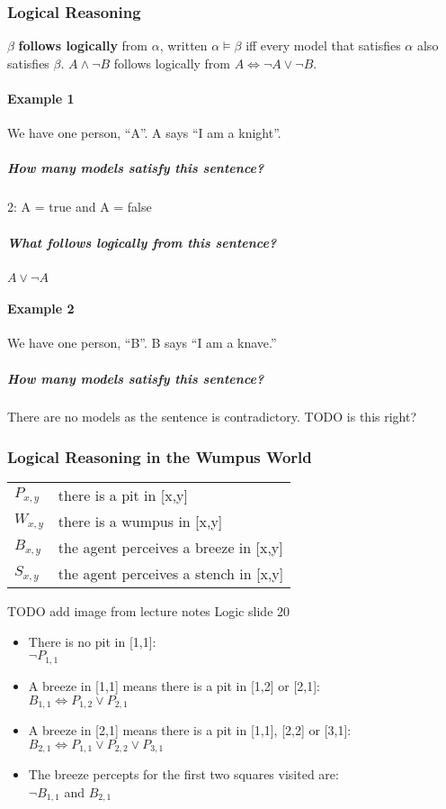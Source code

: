 \subsubsection{Logical Reasoning}
$\beta$ \textbf{follows logically} from $\alpha$, written $\alpha \models
\beta$ iff every model that satisfies $\alpha$ also satisfies $\beta$. $A \land
\neg B$ follows logically from $A \Leftrightarrow \neg A \lor \neg B$.

\paragraph{Example 1} We have one person, ``A''. A says ``I am a knight''.
\subparagraph{How many models satisfy this sentence?} 2: {A = true} and {A =
false}
\subparagraph{What follows logically from this sentence?} $A \lor \neg A$

\paragraph{Example 2} We have one person, ``B''. B says ``I am a knave.''
\subparagraph{How many models satisfy this sentence?} There are no models as
the sentence is contradictory. TODO is this right?

\subsubsection{Logical Reasoning in the Wumpus World}
\begin{tabular}{l l}
$P_{x,y}$ & there is a pit in [x,y]\\
$W_{x,y}$ & there is a wumpus in [x,y]\\
$B_{x,y}$ & the agent perceives a breeze in [x,y]\\
$S_{x,y}$ & the agent perceives a stench in [x,y]
\end{tabular}

TODO add image from lecture notes Logic slide 20

\begin{itemize}
    \item There is no pit in [1,1]:\\
          $\neg P_{1,1}$
    \item A breeze in [1,1] means there is a pit in [1,2] or [2,1]:\\
          $B_{1,1} \Leftrightarrow P_{1,2} \lor P_{2,1}$
    \item A breeze in [2,1] means there is a pit in [1,1], [2,2] or [3,1]:\\
          $B_{2,1} \Leftrightarrow P_{1,1} \lor P_{2,2} \lor P_{3,1}$
    \item The breeze percepts for the first two squares visited are:\\
          $\neg B_{1,1}$ and $B_{2,1}$
\end{itemize}

